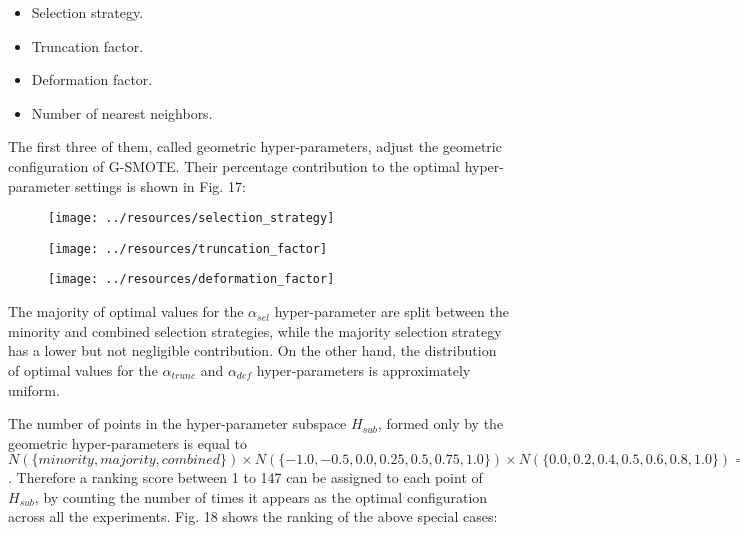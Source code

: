 \documentclass[parskip=full]{scrartcl}
\begin{document}
\begin{itemize}
	
	\renewcommand\labelitemi{--}

	\item Selection strategy.

	\item Truncation factor.

	\item Deformation factor.

	\item Number of nearest neighbors.

\end{itemize}

 The first three of them, called geometric hyper-parameters, adjust the geometric configuration of G-SMOTE. Their percentage contribution to the optimal hyper-parameter settings is shown in Fig. 17:

\begin{figure}[H]
	\centering
	\texttt{[image: ../resources/selection\_strategy]}
\end{figure}

\begin{figure}[H]
	\centering
	\texttt{[image: ../resources/truncation\_factor]}
\end{figure}

\begin{figure}[H]
	\centering
	\texttt{[image: ../resources/deformation\_factor]}
\end{figure}

The majority of optimal values for the \( \alpha_{sel} \) hyper-parameter are split between the minority and combined selection strategies, while the majority selection strategy has a lower but not negligible contribution. On the other hand, the distribution of optimal values for the \( \alpha_{trunc} \) and \( \alpha_{def} \) hyper-parameters is approximately uniform.

The number of points in the hyper-parameter subspace \( H_{sub} \), formed only by the geometric hyper-parameters is equal to $N(\{ minority, majority, combined \}) \times N(\{ -1.0, -0.5, 0.0, 0.25, 0.5, 0.75 , 1.0 \}) \times N(\{ 0.0, 0.2, 0.4, 0.5, 0.6, 0.8, 1.0 \}) = 147$. Therefore a ranking score between 1 to 147 can be assigned to each point of \( H_{sub} \), by counting the number of times it appears as the optimal configuration across all the experiments. Fig. 18 shows the ranking of the above special cases:
\end{document}

